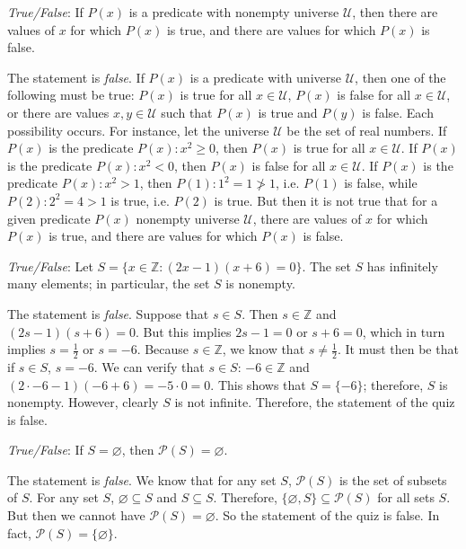 \documentclass[11pt,letterpaper]{article}
\begin{document}
\quizsol \textit{True/False}: If $P(x)$ is a predicate with nonempty universe $\mathcal{U}$, then there are values of $x$ for which $P(x)$ is true, and there are values for which $P(x)$ is false. \pspace

\sol The statement is \textit{false}. If $P(x)$ is a predicate with universe $\mathcal{U}$, then one of the following must be true: $P(x)$ is true for all $x \in \mathcal{U}$, $P(x)$ is false for all $x \in \mathcal{U}$, or there are values $x, y \in \mathcal{U}$ such that $P(x)$ is true and $P(y)$ is false. Each possibility occurs. For instance, let the universe $\mathcal{U}$ be the set of real numbers. If $P(x)$ is the predicate $P(x) \colon x^2 \geq 0$, then $P(x)$ is true for all $x \in \mathcal{U}$. If $P(x)$ is the predicate $P(x) \colon x^2 < 0$, then $P(x)$ is false for all $x \in \mathcal{U}$. If $P(x)$ is the predicate $P(x) \colon x^2 > 1$, then $P(1) \colon 1^2 = 1 \not> 1$, i.e. $P(1)$ is false, while $P(2) \colon 2^2= 4 > 1$ is true, i.e. $P(2)$ is true. But then it is not true that for a given predicate $P(x)$ nonempty universe $\mathcal{U}$, there are values of $x$ for which $P(x)$ is true, and there are values for which $P(x)$ is false. \pvspace{1.3cm}



\quizsol \textit{True/False}: Let $S= \{ x \in \mathbb{Z} \colon (2x - 1)(x + 6)= 0 \}$. The set $S$ has infinitely many elements; in particular, the set $S$ is nonempty. \pspace

\sol The statement is \textit{false}. Suppose that $s \in S$. Then $s \in \mathbb{Z}$ and $(2s - 1)(s + 6)= 0$. But this implies $2s - 1=0$ or $s + 6= 0$, which in turn implies $s= \frac{1}{2}$ or $s= -6$. Because $s \in \mathbb{Z}$, we know that $s \neq \frac{1}{2}$. It must then be that if $s \in S$, $s= -6$. We can verify that $s \in S$: $-6 \in \mathbb{Z}$ and $(2 \cdot -6 - 1)(-6 + 6)= -5 \cdot 0= 0$. This shows that $S= \{ -6 \}$; therefore, $S$ is nonempty. However, clearly $S$ is not infinite. Therefore, the statement of the quiz is false. \pvspace{1.3cm}



\quizsol \textit{True/False}: If $S= \varnothing$, then $\mathcal{P}(S)= \varnothing$. \pspace

\sol The statement is \textit{false}. We know that for any set $S$, $\mathcal{P}(S)$ is the set of subsets of $S$. For any set $S$, $\varnothing \subseteq S$ and $S \subseteq S$. Therefore, $\{ \varnothing, S \} \subseteq \mathcal{P}(S)$ for all sets $S$. But then we cannot have $\mathcal{P}(S)= \varnothing$. So the statement of the quiz is false. In fact, $\mathcal{P}(S)= \{ \varnothing \}$. 
\end{document}
